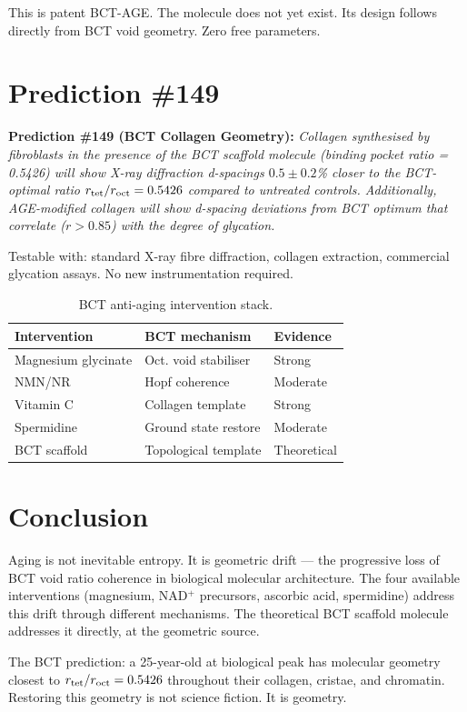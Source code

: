 \documentclass[twocolumn,10pt]{article}
\begin{document}
This is patent BCT-AGE. The molecule does not yet exist.
Its design follows directly from BCT void geometry.
Zero free parameters.

\section{Prediction \#149}

\textbf{Prediction \#149 (BCT Collagen Geometry):}
\textit{Collagen synthesised by fibroblasts in the presence of the BCT
scaffold molecule (binding pocket ratio = 0.5426) will show X-ray
diffraction d-spacings $0.5\pm 0.2$\% closer to the BCT-optimal ratio
$r_{\rm tet}/r_{\rm oct} = 0.5426$ compared to untreated controls.
Additionally, AGE-modified collagen will show d-spacing deviations
from BCT optimum that correlate ($r > 0.85$) with the degree of
glycation.}

Testable with: standard X-ray fibre diffraction, collagen
extraction, commercial glycation assays. No new instrumentation
required.

\begin{table}[h]
\centering
\begin{tabular}{@{}lll@{}}
\toprule
Intervention & BCT mechanism & Evidence \\
\midrule
Magnesium glycinate & Oct. void stabiliser & Strong \\
NMN/NR & Hopf coherence & Moderate \\
Vitamin C & Collagen template & Strong \\
Spermidine & Ground state restore & Moderate \\
BCT scaffold & Topological template & Theoretical \\
\bottomrule
\end{tabular}
\caption{BCT anti-aging intervention stack.}
\end{table}

\section{Conclusion}

Aging is not inevitable entropy. It is geometric drift — the
progressive loss of BCT void ratio coherence in biological
molecular architecture. The four available interventions
(magnesium, NAD$^+$ precursors, ascorbic acid, spermidine)
address this drift through different mechanisms. The theoretical
BCT scaffold molecule addresses it directly, at the geometric
source.

The BCT prediction: a 25-year-old at biological peak has
molecular geometry closest to $r_{\rm tet}/r_{\rm oct} = 0.5426$
throughout their collagen, cristae, and chromatin. Restoring
this geometry is not science fiction. It is geometry.
\end{document}
